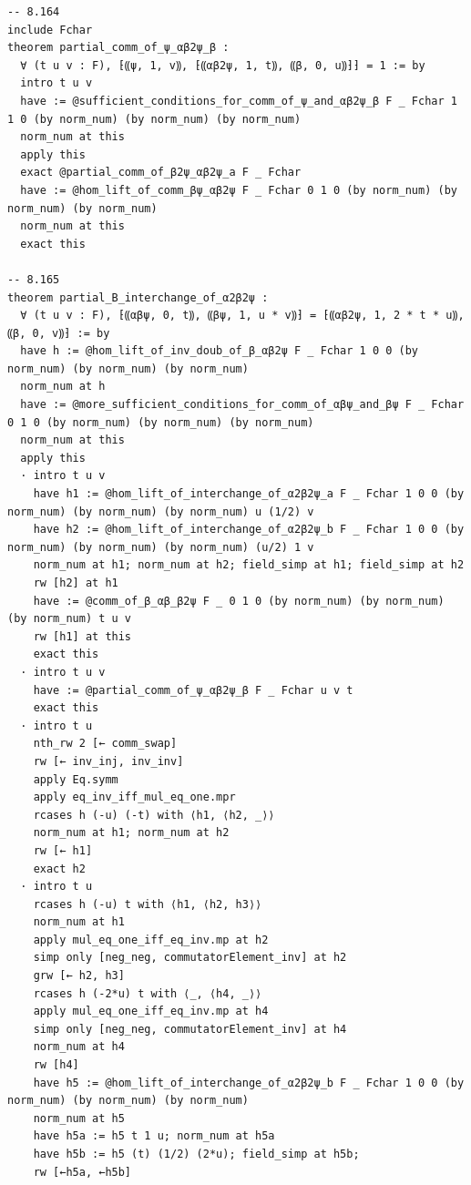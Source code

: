 \documentclass[10pt,a4paper]{article}
\begin{document}
\begin{Verbatim}
-- 8.164
include Fchar
theorem partial_comm_of_ψ_αβ2ψ_β :
  ∀ (t u v : F), ⁅⸨ψ, 1, v⸩, ⁅⸨αβ2ψ, 1, t⸩, ⸨β, 0, u⸩⁆⁆ = 1 := by
  intro t u v
  have := @sufficient_conditions_for_comm_of_ψ_and_αβ2ψ_β F _ Fchar 1 1 0 (by norm_num) (by norm_num) (by norm_num)
  norm_num at this
  apply this
  exact @partial_comm_of_β2ψ_αβ2ψ_a F _ Fchar
  have := @hom_lift_of_comm_βψ_αβ2ψ F _ Fchar 0 1 0 (by norm_num) (by norm_num) (by norm_num)
  norm_num at this
  exact this

-- 8.165
theorem partial_B_interchange_of_α2β2ψ :
  ∀ (t u v : F), ⁅⸨αβψ, 0, t⸩, ⸨βψ, 1, u * v⸩⁆ = ⁅⸨αβ2ψ, 1, 2 * t * u⸩, ⸨β, 0, v⸩⁆ := by
  have h := @hom_lift_of_inv_doub_of_β_αβ2ψ F _ Fchar 1 0 0 (by norm_num) (by norm_num) (by norm_num)
  norm_num at h
  have := @more_sufficient_conditions_for_comm_of_αβψ_and_βψ F _ Fchar 0 1 0 (by norm_num) (by norm_num) (by norm_num)
  norm_num at this
  apply this
  · intro t u v
    have h1 := @hom_lift_of_interchange_of_α2β2ψ_a F _ Fchar 1 0 0 (by norm_num) (by norm_num) (by norm_num) u (1/2) v
    have h2 := @hom_lift_of_interchange_of_α2β2ψ_b F _ Fchar 1 0 0 (by norm_num) (by norm_num) (by norm_num) (u/2) 1 v
    norm_num at h1; norm_num at h2; field_simp at h1; field_simp at h2
    rw [h2] at h1
    have := @comm_of_β_αβ_β2ψ F _ 0 1 0 (by norm_num) (by norm_num) (by norm_num) t u v
    rw [h1] at this
    exact this
  · intro t u v
    have := @partial_comm_of_ψ_αβ2ψ_β F _ Fchar u v t
    exact this
  · intro t u
    nth_rw 2 [← comm_swap]
    rw [← inv_inj, inv_inv]
    apply Eq.symm
    apply eq_inv_iff_mul_eq_one.mpr
    rcases h (-u) (-t) with ⟨h1, ⟨h2, _⟩⟩
    norm_num at h1; norm_num at h2
    rw [← h1]
    exact h2
  · intro t u
    rcases h (-u) t with ⟨h1, ⟨h2, h3⟩⟩
    norm_num at h1
    apply mul_eq_one_iff_eq_inv.mp at h2
    simp only [neg_neg, commutatorElement_inv] at h2
    grw [← h2, h3]
    rcases h (-2*u) t with ⟨_, ⟨h4, _⟩⟩
    apply mul_eq_one_iff_eq_inv.mp at h4
    simp only [neg_neg, commutatorElement_inv] at h4
    norm_num at h4
    rw [h4]
    have h5 := @hom_lift_of_interchange_of_α2β2ψ_b F _ Fchar 1 0 0 (by norm_num) (by norm_num) (by norm_num)
    norm_num at h5
    have h5a := h5 t 1 u; norm_num at h5a
    have h5b := h5 (t) (1/2) (2*u); field_simp at h5b;
    rw [←h5a, ←h5b]


\end{Verbatim}
\end{document}
